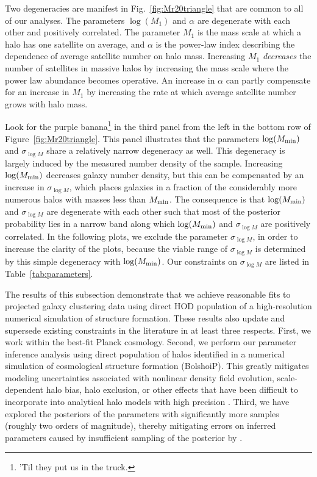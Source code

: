 \documentclass[usenatbib,usegraphicx,letterpaper]{mn2e}
\begin{document}
Two degeneracies are manifest in Fig.~\ref{fig:Mr20triangle} that are common to all of our
analyses. The parameters $\log (M_1)$ and $\alpha$ are degenerate with each other and positively
correlated. The parameter $M_1$ is the mass scale at which a halo has one satellite on
average, and $\alpha$ is the power-law index describing the dependence of average satellite
number on halo mass. Increasing $M_1$ {\em decreases} the number of satellites in massive halos
by increasing the mass scale where the power law abundance becomes operative. 
An increase in $\alpha$ can partly
compensate for an increase in $M_1$ by increasing 
the rate at which average satellite number
grows with halo mass.


Look for the purple banana\footnote{'Til they put us in the truck.} in the third panel from the left in 
the bottom row of Figure~\ref{fig:Mr20triangle}. This panel illustrates that the parameters
$\log (M_{\rm min})$ and $\sigma_{\log M}$ share a relatively narrow degeneracy as well.
This degeneracy is largely induced by the measured
number density of the sample. Increasing $\log (M_{\rm min})$ decreases galaxy
number density, but this can be compensated by an increase in $\sigma_{\log M}$, which
places galaxies in a fraction of the considerably more numerous halos with masses less
than $M_{\rm min}$. The consequence is that $\log (M_{\rm min})$ and $\sigma_{\log M}$ are
degenerate with each other such that most of the posterior probability lies in a narrow band
along which $\log (M_{\rm min})$ and $\sigma_{\log M}$ are positively correlated.
In the following plots, we exclude the parameter $\sigma_{\log M}$,
in order to increase the clarity of the plots, because the viable range of $\sigma_{\log M}$ is
determined by this simple degeneracy with $\log (M_{\rm min})$. Our constraints on $\sigma_{\log M}$ are listed in Table~\ref{tab:parameters}.


The results of this subsection demonstrate that we achieve reasonable fits to projected galaxy clustering
data using direct HOD population of a high-resolution numerical simulation of structure formation. These results
also update and supersede existing constraints in the literature in at least three respects. First, we work within the
best-fit Planck cosmology. Second, we perform our parameter inference analysis using direct population of halos
identified in a numerical simulation of cosmological structure formation (BolshoiP). This greatly mitigates modeling
uncertainties associated with nonlinear density field evolution, scale-dependent halo bias, halo exclusion,
or other effects that have been difficult to incorporate into analytical halo models with high precision
\citep[e.g.,][and references therein]{vdBosch13}. Third,
we have explored the posteriors of the parameters with significantly more samples (roughly two orders of magnitude),
thereby mitigating errors on inferred parameters caused by insufficient sampling of the
posterior by \citet{zehavi_etal11}.
\end{document}
